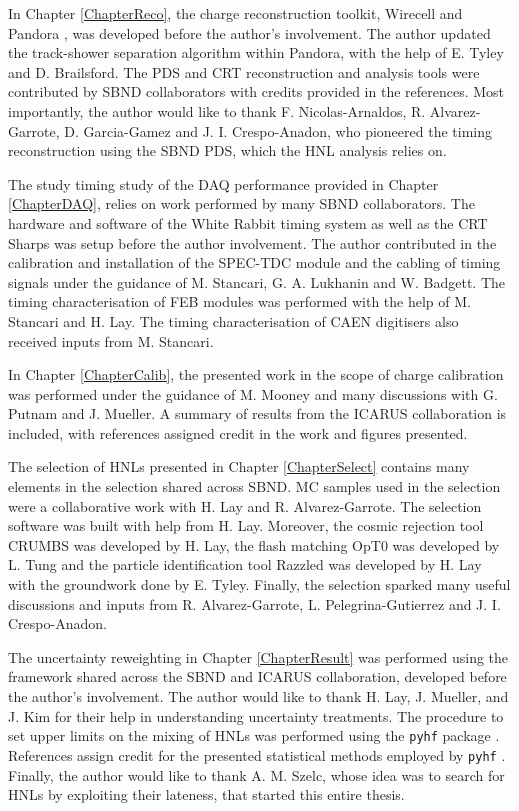 \begin{declaration}
In Chapter \ref{ChapterReco}, the charge reconstruction toolkit, Wirecell \cite{wirecell} and Pandora \cite{pandora}, was developed before the author's involvement.
The author updated the track-shower separation algorithm within Pandora, with the help of E. Tyley and D. Brailsford.
The PDS and CRT reconstruction and analysis tools were contributed by SBND collaborators with credits provided in the references.
Most importantly, the author would like to thank F. Nicolas-Arnaldos, R. Alvarez-Garrote, D. Garcia-Gamez and J. I. Crespo-Anadon, who pioneered the timing reconstruction using the SBND PDS, which the HNL analysis relies on.

The study timing study of the DAQ performance provided in Chapter \ref{ChapterDAQ}, relies on work performed by many SBND collaborators.
The hardware and software of the White Rabbit timing system as well as the CRT Sharps was setup before the author involvement.
The author contributed in the calibration and installation of the SPEC-TDC module and the cabling of timing signals under the guidance of M. Stancari, G. A. Lukhanin and W. Badgett.
The timing characterisation of FEB modules was performed with the help of M. Stancari and H. Lay.
The timing characterisation of CAEN digitisers also received inputs from M. Stancari.  

In Chapter \ref{ChapterCalib}, the presented work in the scope of charge calibration was performed under the guidance of M. Mooney and many discussions with G. Putnam and J. Mueller.
A summary of results from the ICARUS collaboration is included, with references assigned credit in the work and figures presented.

The selection of HNLs presented in Chapter \ref{ChapterSelect} contains many elements in the selection shared across SBND.
MC samples used in the selection were a collaborative work with H. Lay and R. Alvarez-Garrote.
The selection software was built with help from H. Lay. 
Moreover, the cosmic rejection tool CRUMBS was developed by H. Lay, the flash matching OpT0 was developed by L. Tung and the particle identification tool Razzled was developed by H. Lay with the groundwork done by E. Tyley.
Finally, the selection sparked many useful discussions and inputs from R. Alvarez-Garrote, L. Pelegrina-Gutierrez and J. I. Crespo-Anadon.

The uncertainty reweighting in Chapter \ref{ChapterResult} was performed using the framework shared across the SBND and ICARUS collaboration, developed before the author's involvement.
The author would like to thank H. Lay, J. Mueller, and J. Kim for their help in understanding uncertainty treatments.
The procedure to set upper limits on the mixing of HNLs was performed using the \texttt{pyhf} package \cite{pyhf}.
References assign credit for the presented statistical methods employed by \texttt{pyhf} \cite{asymptotic_test, CLs_Junk, CLs_Read}.
Finally, the author would like to thank A. M. Szelc, whose idea was to search for HNLs by exploiting their lateness, that started this entire thesis.  


\end{declaration}

